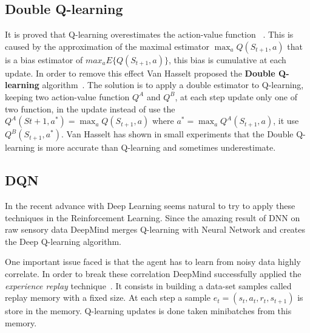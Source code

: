 \subsection{Double Q-learning}

It is proved that Q-learning overestimates the action-value function 
~\cite{NIPS2010_3964}. This is caused by the approximation of the maximal estimator $\max_a Q(S_{t+1}, a)$ that is a bias estimator of $max_a E \{ Q(S_{t+1}, a) \}$, this bias is cumulative at each update. In order to remove this effect Van Hasselt proposed the \textbf{Double Q-learning} algorithm~\cite{NIPS2010_3964}. 
The solution is to apply a double estimator to Q-learning, keeping two action-value function $Q^A$ and $Q^B$, at each step update only one of two function, in the update instead of use the $Q^A(S{t+1}, a^*) = \max_a Q(S_{t+1}, a)$ where $a^* = \max_a Q^A(S_{t+1}, a)$, it use $Q^B(S_{t+1}, a^*)$.
Van Hasselt has shown in small experiments that the Double Q-learning is more accurate than Q-learning and sometimes underestimate.

\subsection{DQN}

In the recent advance with Deep Learning seems natural to try to apply these techniques in the Reinforcement Learning. Since the amazing result of DNN on raw sensory data DeepMind merges Q-learning with Neural Network and creates the Deep Q-learning algorithm.

One important issue faced is that the agent has to learn from noisy data highly correlate. In order to break these correlation DeepMind successfully applied the \textit{experience replay} technique~\cite{Lin:1992:RLR:168871}. It consists in building a data-set samples called replay memory with a fixed size. At each step a sample $e_t = (s_t, a_t, r_t, s_{t+1})$ is store in the memory. Q-learning updates is done taken minibatches from this memory.
